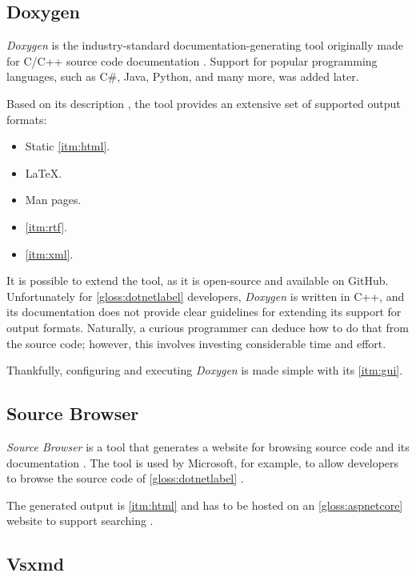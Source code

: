 \subsection{Doxygen} \label{sec:doxygen}

\textit{Doxygen} is the industry-standard documentation-generating tool originally made for C/C++ source code documentation \cite{heesch_doxygen_2022}. Support for popular programming languages, such as C\#, Java, Python, and many more, was added later.

Based on its description \cite{heesch_doxygen_2022}, the tool provides an extensive set of supported output formats:
\begin{itemize}
    \item Static \ref{itm:html}.
    \item \LaTeX.
    \item Man pages.
    \item \ref{itm:rtf}.
    \item \ref{itm:xml}.
\end{itemize}

It is possible to extend the tool, as it is open-source and available on GitHub. Unfortunately for \ref{gloss:dotnetlabel} developers, \textit{Doxygen} is written in C++, and its documentation does not provide clear guidelines for extending its support for output formats. Naturally, a curious programmer can deduce how to do that from the source code; however, this involves investing considerable time and effort.

Thankfully, configuring and executing \textit{Doxygen} is made simple with its \ref{itm:gui}.

\subsection{Source Browser}

\textit{Source Browser} is a tool that generates a website for browsing source code and its documentation \cite{osenkov_sourcebrowser_2022}. The tool is used by Microsoft, for example, to allow developers to browse the source code of \ref{gloss:dotnetlabel} \cite{osenkov_sourcebrowser_2022}.

The generated output is \ref{itm:html} and has to be hosted on an \ref{gloss:aspnetcore} website to support searching \cite{osenkov_sourcebrowser_2022}.

\subsection{Vsxmd} \label{ssec:vsxmd}

